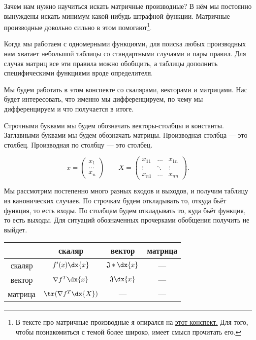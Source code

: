 \begin{sol}
Зачем нам нужно научиться искать матричные производные?  В нём мы постоянно вынуждены искать минимум какой-нибудь штрафной функции. Матричные производные довольно сильно в этом помогают\footnote{В тексте про матричные производные я опирался на \href{http://www.machinelearning.ru/wiki/images/5/50/MOMO17_Seminar2.pdf}{этот конспект.} Для того, чтобы познакомиться с темой более широко, имеет смысл прочитать его.}. 

Когда мы работаем с одномерными функциями, для поиска любых производных нам хватает небольшой таблицы со стандартными случаями и пары правил. Для случая матриц все эти правила можно обобщить, а таблицы дополнить специфическими функциями вроде определителя. 

Мы будем работать в этом конспекте со скалярами, векторами и матрицами. Нас будет интересовать, что именно мы дифференцируем, по чему мы дифференцируем и что получается в итоге.  

Строчными буквами мы будем обозначать векторы-столбцы и константы. Заглавными буквами мы будем обозначать матрицы. Производная столбца --- это столбец. Производная по столбцу --- это столбец. 

\[
x = \begin{pmatrix}x_1 \\ \ldots \\ x_n \end{pmatrix} \qquad X = \begin{pmatrix}x_{11} & \ldots & x_{1n} \\ \vdots & \ddots & \vdots \\ x_{n1} & \ldots & x_{nn}  \end{pmatrix}.
\]

Мы рассмотрим постепенно много разных входов и выходов,  и получим таблицу из канонических случаев. По строчкам будем откладывать то, откуда бьёт функция, то есть входы. По столбцам будем откладывать то, куда бьёт функция, то есть выходы. Для ситуаций обозначенных прочерками обобщения получить не выйдет. 

\begin{center} 
    \begin{tabular}{|c|c|c|c|}
    \hline
        & скаляр & вектор & матрица \\
    \hline 
    скаляр & $f'(x) \dx{x}$  &  $\mathfrak{J} * \dx{x}$  & ---          \\
    \hline
    вектор & $\nabla f^T \dx{x}$    &   $\mathfrak{J} \dx{x}$     &  ---        \\
    \hline
    матрица & $\tr(\nabla f^T \dx{X})$    &    ---    & ---        \\
    \hline
    \end{tabular}
\end{center} 


\end{sol}
